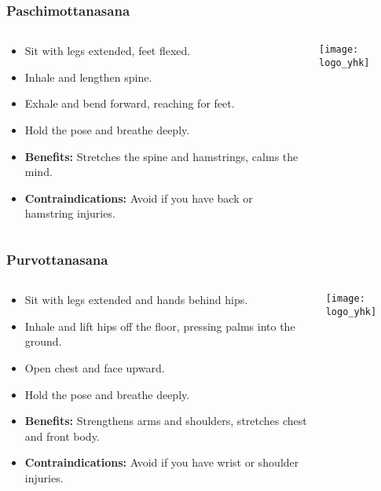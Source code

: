 \begin{frame}[fragile]\frametitle{Paschimottanasana}
\begin{columns}
    \begin{column}[T]{0.5\linewidth}
      \begin{itemize}
        \item Sit with legs extended, feet flexed.
        \item Inhale and lengthen spine.
        \item Exhale and bend forward, reaching for feet.
        \item Hold the pose and breathe deeply.
        \item \textbf{Benefits:} Stretches the spine and hamstrings, calms the mind.
        \item \textbf{Contraindications:} Avoid if you have back or hamstring injuries.
      \end{itemize}
    \end{column}
    \begin{column}[T]{0.5\linewidth}
        \begin{center}
        \texttt{[image: logo\_yhk]}
        \end{center}    
    \end{column}
  \end{columns}
\end{frame}

\begin{frame}[fragile]\frametitle{Purvottanasana}
\begin{columns}
    \begin{column}[T]{0.5\linewidth}
      \begin{itemize}
        \item Sit with legs extended and hands behind hips.
        \item Inhale and lift hips off the floor, pressing palms into the ground.
        \item Open chest and face upward.
        \item Hold the pose and breathe deeply.
        \item \textbf{Benefits:} Strengthens arms and shoulders, stretches chest and front body.
        \item \textbf{Contraindications:} Avoid if you have wrist or shoulder injuries.
      \end{itemize}
    \end{column}
    \begin{column}[T]{0.5\linewidth}
        \begin{center}
        \texttt{[image: logo\_yhk]}
        \end{center}    
    \end{column}
  \end{columns}
\end{frame}

